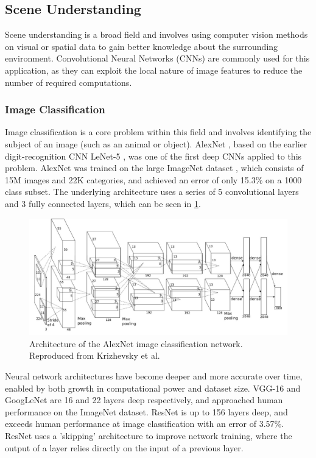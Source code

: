 \documentclass[12pt]{article}
\begin{document}
\pagebreak
\subsection{Scene Understanding}
Scene understanding is a broad field and involves using computer vision methods
on visual or spatial data to gain better knowledge about the surrounding environment.
Convolutional Neural Networks (CNNs) are commonly used for this application, as they
can exploit the local nature of image features to reduce the number of required computations.

\subsubsection{Image Classification}
Image classification is a core problem within this field and involves identifying the subject of an image (such as an animal or object).
AlexNet \cite{krizhevskyImageNetClassificationDeep2012}, based on the earlier digit-recognition CNN LeNet-5
\cite{lecunGradientbasedLearningApplied1998}, was one of the first deep CNNs
applied to this problem. AlexNet was trained on the large ImageNet dataset \cite{jiadengImageNetLargescaleHierarchical2009},
which consists of 15M images and 22K categories,
and achieved an error of only 15.3\% on a 1000 class subset. The underlying architecture uses a series of 5 convolutional
layers and 3 fully connected layers, which can be seen in \cref{fig:alexnet_architecture}.

\begin{figure}[H]
    \centering
    \includegraphics[width=0.8\linewidth]{images/alexnet_architecture.png}
    \caption{Architecture of the AlexNet image classification network. Reproduced from Krizhevsky et al. \cite{krizhevskyImageNetClassificationDeep2012}}
    \label{fig:alexnet_architecture}
\end{figure}

Neural network architectures have become deeper and more accurate over time, enabled by both
growth in computational power and dataset size. VGG-16 \cite{simonyanVeryDeepConvolutional2014}
and GoogLeNet \cite{szegedyGoingDeeperConvolutions2014}
are 16 and 22 layers deep respectively, and approached
human performance on the ImageNet dataset. ResNet \cite{heDeepResidualLearning2016} is up to 156 layers deep,
and exceeds human performance at image classification with an error of 3.57\%.
ResNet uses a 'skipping' architecture to improve network training, where the output of a layer relies directly on
the input of a previous layer.
\end{document}
